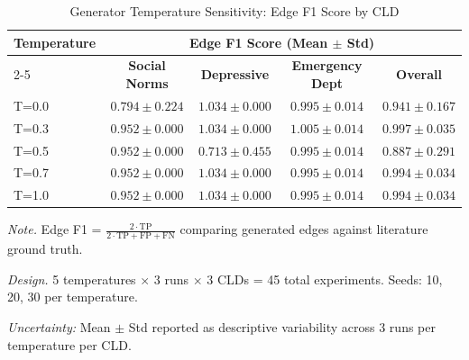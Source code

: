 \begin{table}[H]
\centering
\caption{Generator Temperature Sensitivity: Edge F1 Score by CLD}
\label{tab:temperature_sensitivity}
\begin{threeparttable}
\begin{tabular}{lcccc}
\toprule
\textbf{Temperature} & \multicolumn{4}{c}{\textbf{Edge F1 Score (Mean $\pm$ Std)}} \\
\cmidrule(lr){2-5}
 & \textbf{Social Norms} & \textbf{Depressive} & \textbf{Emergency Dept} & \textbf{Overall} \\
\midrule
T=0.0 & $0.794 \pm 0.224$ & $1.034 \pm 0.000$ & $0.995 \pm 0.014$ & $0.941 \pm 0.167$ \\
T=0.3 & $0.952 \pm 0.000$ & $1.034 \pm 0.000$ & $1.005 \pm 0.014$ & $0.997 \pm 0.035$ \\
T=0.5 & $0.952 \pm 0.000$ & $0.713 \pm 0.455$ & $0.995 \pm 0.014$ & $0.887 \pm 0.291$ \\
T=0.7 & $0.952 \pm 0.000$ & $1.034 \pm 0.000$ & $0.995 \pm 0.014$ & $0.994 \pm 0.034$ \\
T=1.0 & $0.952 \pm 0.000$ & $1.034 \pm 0.000$ & $0.995 \pm 0.014$ & $0.994 \pm 0.034$ \\
\bottomrule
\end{tabular}
\begin{tablenotes}
\small
\item \textit{Note.} Edge F1 = $\frac{2 \cdot \text{TP}}{2 \cdot \text{TP} + \text{FP} + \text{FN}}$ comparing generated edges against literature ground truth.
\item \textit{Design.} 5 temperatures $\times$ 3 runs $\times$ 3 CLDs = 45 total experiments. Seeds: 10, 20, 30 per temperature.
\item \textit{Uncertainty:} Mean $\pm$ Std reported as descriptive variability across 3 runs per temperature per CLD.
\end{tablenotes}
\end{threeparttable}
\end{table}